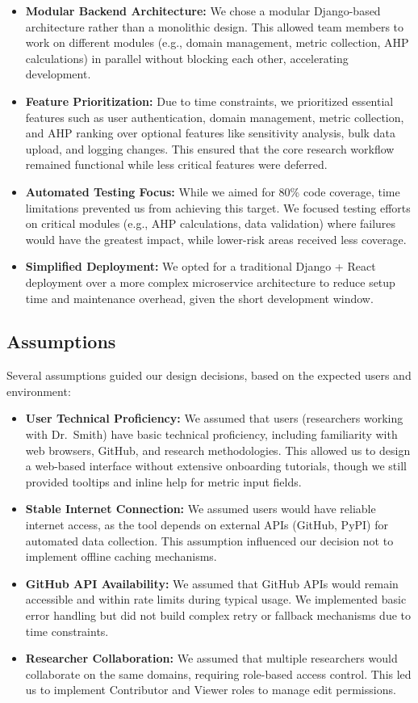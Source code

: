 \documentclass{article}
\begin{document}
\begin{itemize}
  \item \textbf{Modular Backend Architecture:} We chose a modular Django-based architecture rather than a monolithic design. This allowed team members to work on different modules (e.g., domain management, metric collection, AHP calculations) in parallel without blocking each other, accelerating development.
  \item \textbf{Feature Prioritization:} Due to time constraints, we prioritized essential features such as user authentication, domain management, metric collection, and AHP ranking over optional features like sensitivity analysis, bulk data upload, and logging changes. This ensured that the core research workflow remained functional while less critical features were deferred.
  \item \textbf{Automated Testing Focus:} While we aimed for 80\% code coverage, time limitations prevented us from achieving this target. We focused testing efforts on critical modules (e.g., AHP calculations, data validation) where failures would have the greatest impact, while lower-risk areas received less coverage.
  \item \textbf{Simplified Deployment:} We opted for a traditional Django + React deployment over a more complex microservice architecture to reduce setup time and maintenance overhead, given the short development window.
\end{itemize}

\subsection{Assumptions}

Several assumptions guided our design decisions, based on the expected users and environment:

\begin{itemize}
  \item \textbf{User Technical Proficiency:} We assumed that users (researchers working with Dr.~Smith) have basic technical proficiency, including familiarity with web browsers, GitHub, and research methodologies. This allowed us to design a web-based interface without extensive onboarding tutorials, though we still provided tooltips and inline help for metric input fields.
  \item \textbf{Stable Internet Connection:} We assumed users would have reliable internet access, as the tool depends on external APIs (GitHub, PyPI) for automated data collection. This assumption influenced our decision not to implement offline caching mechanisms.
  \item \textbf{GitHub API Availability:} We assumed that GitHub APIs would remain accessible and within rate limits during typical usage. We implemented basic error handling but did not build complex retry or fallback mechanisms due to time constraints.
  \item \textbf{Researcher Collaboration:} We assumed that multiple researchers would collaborate on the same domains, requiring role-based access control. This led us to implement Contributor and Viewer roles to manage edit permissions.
\end{itemize}
\end{document}
